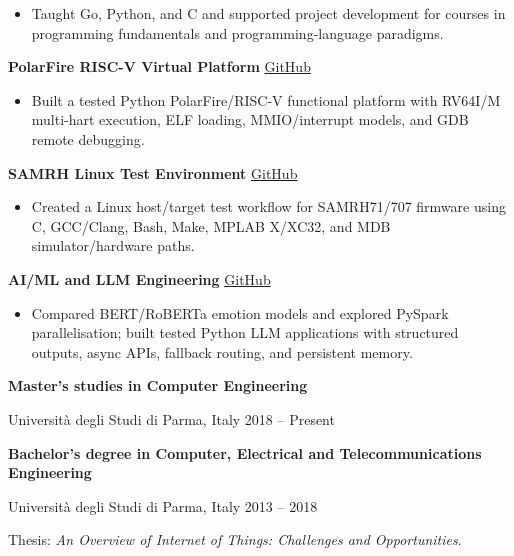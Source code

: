 \documentclass[10pt,a4paper,ragged2e]{altacv}
\begin{document}
\begin{itemize}
  \item Taught Go, Python, and C and supported project development for courses in programming fundamentals and programming-language paradigms.
\end{itemize}


\textcolor{accent}{\textbf{PolarFire RISC-V Virtual Platform}} \hfill \href{https://github.com/LucaGandolfi77/random/tree/main/polarfire-vp}{GitHub}
\begin{itemize}
  \item Built a tested Python PolarFire/RISC-V functional platform with RV64I/M multi-hart execution, ELF loading, MMIO/interrupt models, and GDB remote debugging.
\end{itemize}

\textcolor{accent}{\textbf{SAMRH Linux Test Environment}} \hfill \href{https://github.com/LucaGandolfi77/random/tree/main/samrh-mplab-linux-env}{GitHub}
\begin{itemize}
  \item Created a Linux host/target test workflow for SAMRH71/707 firmware using C, GCC/Clang, Bash, Make, MPLAB X/XC32, and MDB simulator/hardware paths.
\end{itemize}

\textcolor{accent}{\textbf{AI/ML and LLM Engineering}} \hfill \href{https://github.com/LucaGandolfi77/random}{GitHub}
\begin{itemize}
  \item Compared BERT/RoBERTa emotion models and explored PySpark parallelisation; built tested Python LLM applications with structured outputs, async APIs, fallback routing, and persistent memory.
\end{itemize}


\textbf{Master's studies in Computer Engineering}\par
Universit\`a degli Studi di Parma, Italy \hfill 2018 -- Present\par
\smallskip
\textbf{Bachelor's degree in Computer, Electrical and Telecommunications Engineering}\par
Universit\`a degli Studi di Parma, Italy \hfill 2013 -- 2018\par
Thesis: \textit{An Overview of Internet of Things: Challenges and Opportunities}.
\end{document}
